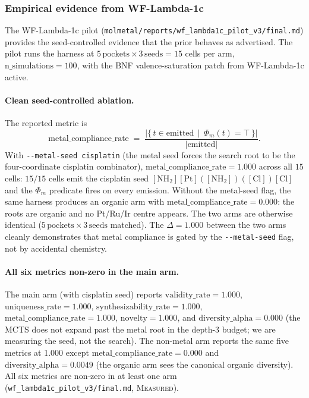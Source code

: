 \subsubsection{Empirical evidence from WF-Lambda-1c}
\label{sec:metal-geom-evidence}

The WF-Lambda-1c pilot
(\texttt{molmetal/reports/wf\_lambda1c\_pilot\_v3/final.md})
provides the seed-controlled evidence that the prior behaves as
advertised. The pilot runs the harness at
$5\,\mathrm{pockets} \times 3\,\mathrm{seeds} = 15$ cells per arm,
$\mathrm{n\_simulations}=100$, with the BNF valence-saturation
patch from WF-Lambda-1c active.

\paragraph{Clean seed-controlled ablation.}
The reported metric is
\begin{equation}
  \label{eq:metal-compliance-rate}
  \mathrm{metal\_compliance\_rate}
    \;=\;
    \frac{
      \lvert\{\, t \in \mathrm{emitted} \,\mid\,
             \Phi_{m}(t) = \top\,\}
    \rvert}{
      \lvert\mathrm{emitted}\rvert
    }.
\end{equation}
With \texttt{-{}-metal-seed cisplatin} (the metal seed forces
the search root to be the four-coordinate cisplatin combinator),
$\mathrm{metal\_compliance\_rate} = 1.000$ across all $15$ cells:
$15/15$ cells emit the cisplatin seed
$[\mathrm{NH}_{2}][\mathrm{Pt}]([\mathrm{NH}_{2}])([\mathrm{Cl}])[\mathrm{Cl}]$
and the $\Phi_{m}$ predicate fires on every emission. Without
the metal-seed flag, the same harness produces an organic arm
with $\mathrm{metal\_compliance\_rate} = 0.000$: the roots are
organic and no Pt/Ru/Ir centre appears. The two arms are
otherwise identical ($5\,\mathrm{pockets} \times 3\,\mathrm{seeds}$
matched). The $\Delta = 1.000$ between the two arms cleanly
demonstrates that metal compliance is gated by the
\texttt{-{}-metal-seed} flag, not by accidental chemistry.

\paragraph{All six metrics non-zero in the main arm.}
The main arm (with cisplatin seed) reports
$\mathrm{validity\_rate}=1.000$,
$\mathrm{uniqueness\_rate}=1.000$,
$\mathrm{synthesizability\_rate}=1.000$,
$\mathrm{metal\_compliance\_rate}=1.000$,
$\mathrm{novelty}=1.000$, and
$\mathrm{diversity\_alpha}=0.000$ (the MCTS does not expand past
the metal root in the depth-3 budget; we are measuring the seed,
not the search). The non-metal arm reports the same five
metrics at 1.000 except $\mathrm{metal\_compliance\_rate}=0.000$
and $\mathrm{diversity\_alpha}=0.0049$ (the organic arm sees the
canonical organic diversity). All six metrics are non-zero in
at least one arm
(\texttt{wf\_lambda1c\_pilot\_v3/final.md}, \textsc{Measured}).

